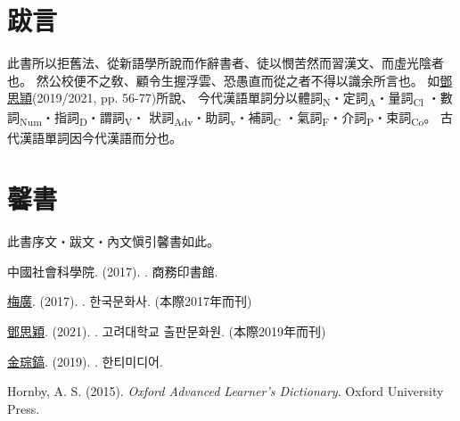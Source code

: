 \chapter*{跋言}
此書所以拒舊法、從新語學所說而作辭書者、徒以憫苦然而習漢文、而虛光陰者也。
然公校便不之敎、顧令生握浮雲、恐愚直而從之者不得以識余所言也。
如\underline{鄧思頴}(2019/2021, pp. 56-77)所說、
今代漢語單詞分以體詞\textsubscript{N}・定詞\textsubscript{A}・量詞\textsubscript{Cl}
・數詞\textsubscript{Num}・指詞\textsubscript{D}・謂詞\textsubscript{V}・
狀詞\textsubscript{Adv}・助詞\textsubscript{v}・補詞\textsubscript{C}
・氣詞\textsubscript{F}・介詞\textsubscript{P}・束詞\textsubscript{Co}。
古代漢語單詞因今代漢語而分也。
\chapter*{馨書}
此書序文・跋文・內文愼引馨書如此。
\par 中國社會科學院. (2017). . 商務印書館.
\par \underline{梅廣}. (2017). . 한국문화사. (本際2017年而刊)
\par \underline{鄧思穎}. (2021). . 고려대학교 출판문화원. (本際2019年而刊)
\par \underline{金琮鎬}. (2019). . 한티미디어.
\par Hornby, A. S. (2015). \textit{Oxford Advanced Learner's Dictionary}. Oxford University Press.
